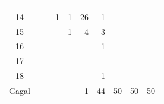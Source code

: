 \begin{minipage}[\minipagealign]{\minipagewidth}
{\begin{tabular}{|c|lllllllll|}
\multicolumn{1}{r|}{} & \multicolumn{1}{r|}{} & \\ \hline 14 & \multicolumn{1}{r|}{} & \multicolumn{1}{r|}{} & \multicolumn{1}{r|}{1} & \multicolumn{1}{r|}{1} & \multicolumn{1}{r|}{26} & \multicolumn{1}{r|}{1} & \multicolumn{1}{r|}{} & \multicolumn{1}{r|}{} & \\ \hline 15 & \multicolumn{1}{r|}{} & \multicolumn{1}{r|}{} & \multicolumn{1}{r|}{} & \multicolumn{1}{r|}{1} & \multicolumn{1}{r|}{4} & \multicolumn{1}{r|}{3} & \multicolumn{1}{r|}{} & \multicolumn{1}{r|}{} & \\ \hline 16 & \multicolumn{1}{r|}{} & \multicolumn{1}{r|}{} & \multicolumn{1}{r|}{} & \multicolumn{1}{r|}{} & \multicolumn{1}{r|}{} & \multicolumn{1}{r|}{1} & \multicolumn{1}{r|}{} & \multicolumn{1}{r|}{} & \\ \hline 17 & \multicolumn{1}{r|}{} & \multicolumn{1}{r|}{} & \multicolumn{1}{r|}{} & \multicolumn{1}{r|}{} & \multicolumn{1}{r|}{} & \multicolumn{1}{r|}{} & \multicolumn{1}{r|}{} & \multicolumn{1}{r|}{} & \\ \hline 18 & \multicolumn{1}{r|}{} & \multicolumn{1}{r|}{} & \multicolumn{1}{r|}{} & \multicolumn{1}{r|}{} & \multicolumn{1}{r|}{} & \multicolumn{1}{r|}{1} & \multicolumn{1}{r|}{} & \multicolumn{1}{r|}{} & \\ \hline Gagal & \multicolumn{1}{r|}{} & \multicolumn{1}{r|}{} & \multicolumn{1}{r|}{} & \multicolumn{1}{r|}{} & \multicolumn{1}{r|}{1} & \multicolumn{1}{r|}{44} & \multicolumn{1}{r|}{50} & \multicolumn{1}{r|}{50} & 50 \\ \hline
		\end{tabular}
	}
	\label{tab:freq-emd-large-bf}
\end{minipage}
